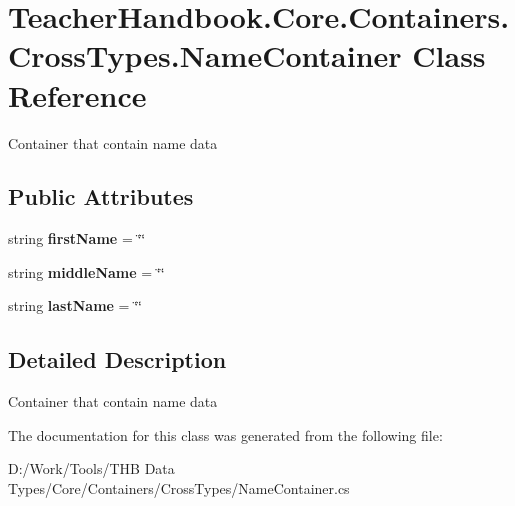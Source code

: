 \hypertarget{class_teacher_handbook_1_1_core_1_1_containers_1_1_cross_types_1_1_name_container}{}\section{Teacher\+Handbook.\+Core.\+Containers.\+Cross\+Types.\+Name\+Container Class Reference}
\label{class_teacher_handbook_1_1_core_1_1_containers_1_1_cross_types_1_1_name_container}


Container that contain name data  


\subsection*{Public Attributes}
\begin{DoxyCompactItemize}
\item 
\mbox{\label{class_teacher_handbook_1_1_core_1_1_containers_1_1_cross_types_1_1_name_container_a25225029333995c9cf056b2a6a5eafb9}} 
string {\bfseries first\+Name} = \char`\"{}\char`\"{}
\item 
\mbox{\label{class_teacher_handbook_1_1_core_1_1_containers_1_1_cross_types_1_1_name_container_a11d62ef2b09dcf50ec4c9d1e6bb36f85}} 
string {\bfseries middle\+Name} = \char`\"{}\char`\"{}
\item 
\mbox{\label{class_teacher_handbook_1_1_core_1_1_containers_1_1_cross_types_1_1_name_container_a7427eea89f14e950f33efd2135607d4a}} 
string {\bfseries last\+Name} = \char`\"{}\char`\"{}
\end{DoxyCompactItemize}


\subsection{Detailed Description}
Container that contain name data 



The documentation for this class was generated from the following file\+:\begin{DoxyCompactItemize}
\item 
D\+:/\+Work/\+Tools/\+T\+H\+B Data Types/\+Core/\+Containers/\+Cross\+Types/Name\+Container.\+cs\end{DoxyCompactItemize}
